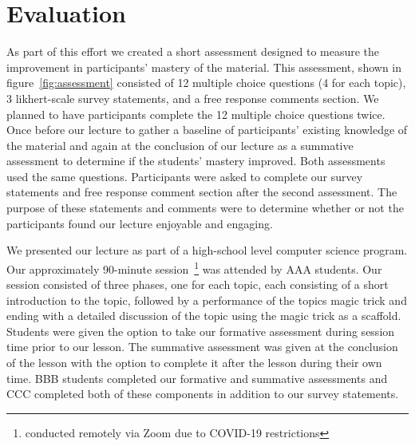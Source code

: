 \section{Evaluation}
\label{SEC:evaluation}

As part of this effort we created a short assessment
designed to measure the improvement in participants' mastery of the material.
This assessment, shown in figure~\ref{fig:assessment}
consisted of 12 multiple choice questions (4 for each topic),
3 likhert-scale survey statements,
and a free response comments section.
We planned to have participants complete the 12 multiple choice questions twice.
Once before our lecture to gather a baseline of
participants' existing knowledge of the material and again at the conclusion of our
lecture as a summative assessment to determine if the students' mastery
improved.  Both assessments used the same questions.
Participants were asked to complete our survey statements and
free response comment section after the second assessment.  The purpose of
these statements and comments were to determine whether or not the
participants found our lecture enjoyable and engaging.

We presented our lecture as part of a high-school level computer science
program.
Our approximately 90-minute session~\footnote{conducted remotely
via Zoom due to COVID-19 restrictions} was attended by AAA students.
Our session consisted of three phases, one for each topic, each consisting
of a short introduction to the topic,
followed by a performance of the topics magic trick
and ending with a detailed discussion of the topic
using the magic trick as a scaffold.
Students were given the option to take our formative assessment
during session time prior to our lesson.
The summative assessment was given at the conclusion of the lesson
with the option to complete it after the lesson during their own time.
BBB students completed our formative and summative assessments and CCC
completed both of these components in addition to our survey statements.







